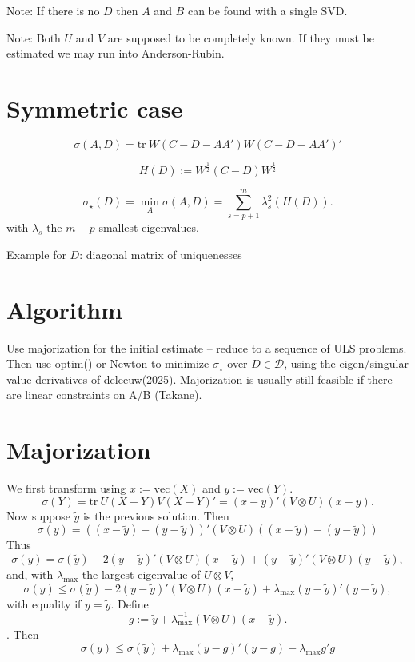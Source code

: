 \documentclass[
  12pt,
  letterpaper,
  DIV=11,
  numbers=noendperiod]{scrartcl}
\begin{document}
Note: If there is no \(D\) then \(A\) and \(B\) can be found with a
single SVD.

Note: Both \(U\) and \(V\) are supposed to be completely known. If they
must be estimated we may run into Anderson-Rubin.

\section{Symmetric case}\label{symmetric-case}

\[
\sigma(A,D)=\text{tr}\ W(C-D-AA')W(C-D-AA')'
\]

\[
H(D):=W^\frac12(C-D)W^\frac12
\]

\[
\sigma_\star(D)=\min_{A}\sigma(A,D)=\sum_{s=p+1}^m\lambda_s^2(H(D)).
\] with \(\lambda_s\) the \(m-p\) smallest eigenvalues.

Example for \(D\): diagonal matrix of uniquenesses

\section{Algorithm}\label{algorithm}

Use majorization for the initial estimate -- reduce to a sequence of ULS
problems. Then use optim() or Newton to minimize \(\sigma_\star\) over
\(D\in\mathcal{D}\), using the eigen/singular value derivatives of
deleeuw(2025). Majorization is usually still feasible if there are
linear constraints on A/B (Takane).

\section{Majorization}\label{majorization}

We first transform using \(x:=\text{vec}(X)\) and \(y:=\text{vec}(Y)\).
\[
\sigma(Y)=\text{tr}\ U(X-Y)V(X-Y)'=(x-y)'(V\otimes U)(x-y).
\] Now suppose \(\tilde y\) is the previous solution. Then \[
\sigma(y)=((x-\tilde y)-(y-\tilde y))'(V\otimes U)((x-\tilde y)-(y-\tilde y))
\] Thus \[
\sigma(y)=\sigma(\tilde y)-2(y-\tilde y)'(V\otimes U)(x-\tilde y)+(y-\tilde y)'(V\otimes U)(y-\tilde y),
\] and, with \(\lambda_{\text{max}}\) the largest eigenvalue of
\(U\otimes V\), \[
\sigma(y)\leq\sigma(\tilde y)-2(y-\tilde y)'(V\otimes U)(x-\tilde y)+\lambda_{\text{max}}(y-\tilde y)'(y-\tilde y),
\] with equality if \(y=\tilde y\). Define \[
g:=\tilde y+\lambda_{\text{max}}^{-1}(V\otimes U)(x-\tilde y).
\]. Then \[
\sigma(y)\leq\sigma(\tilde y)+\lambda_{\text{max}}(y-g)'(y-g)-\lambda_{\text{max}}g'g
\]
\end{document}

